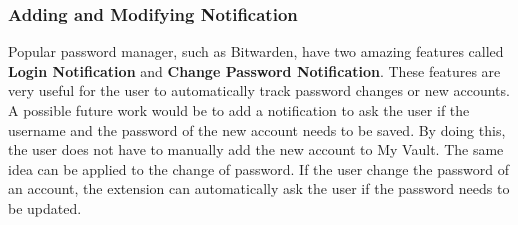 \subsubsection{Adding and Modifying Notification}
Popular password manager, such as Bitwarden, have two amazing features called \textbf{Login Notification} and \textbf{Change Password Notification}. These features are very useful for the user to automatically track password changes or new accounts.
A possible future work would be to add a notification to ask the user if the username and the password of the new account needs to be saved. By doing this, the user does not have to manually add the new account to My Vault.
The same idea can be applied to the change of password. If the user change the password of an account, the extension can automatically ask the user if the password needs to be updated.

